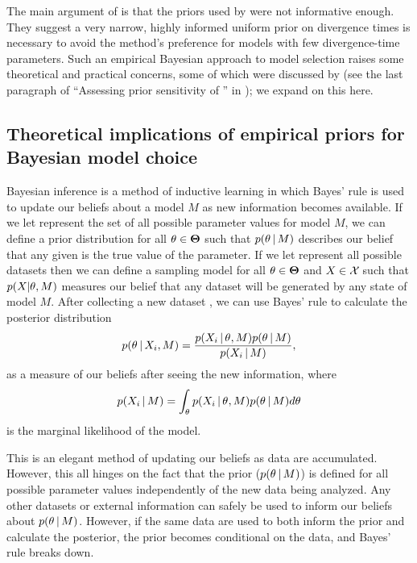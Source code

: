 \documentclass[letterpaper,12pt]{article}
\begin{document}
\begin{linenumbers}
The main argument of \citet{Hickerson2013} is that the priors used by
\citet{Oaks2012} were not informative enough.
They suggest a very narrow, highly informed uniform prior on divergence times
is necessary to avoid the method's preference for models with few
divergence-time parameters.
Such an empirical Bayesian approach to model selection raises some theoretical
and practical concerns, some of which were discussed by \citet{Oaks2012} (see
the last paragraph of ``Assessing prior sensitivity of \msb'' in
\citet{Oaks2012}); we expand on this here.

\subsection*{Theoretical implications of empirical priors for Bayesian model
choice}
\begin{linenomath}
Bayesian inference is a method of inductive learning in which Bayes' rule is
used to update our beliefs about a model $M$ as new information becomes
available.
If we let \allParameterValues represent the set of all possible parameter
values for model $M$, we can define a prior distribution for all $\theta \in
\boldsymbol{\Theta}$ such that $p(\theta \,|\, M)$ describes our belief that
any given \myTheta{} is the true value of the parameter.
If we let \allDatasets represent all possible datasets then we can 
define a sampling model for all $\theta \in
\boldsymbol{\Theta}$ and $\alignment{}{} \in \allDatasets$ such that
$p(\alignment{}{} | \theta, M)$ measures our belief that any dataset \alignment{}{}
will be generated by any state \myTheta{} of model $M$.
After collecting a new dataset , we can use Bayes' rule to
calculate the posterior distribution
\begin{equation}
    p(\myTheta{} \given \alignment{i}{}, M) = \frac{p(\alignment{i}{} \given
    \myTheta{}, M)p(\myTheta{} \given M)}{p(\alignment{i}{} \given M)},
    \label{eq:bayesrule}
\end{equation}
as a measure of our beliefs after seeing the new information, where
\begin{equation}
    p(\alignment{i}{} \given M) = \int_{\myTheta{}} p(\alignment{i}{} \given
    \myTheta{}, M)p(\myTheta{} \given M) d\myTheta{}
    \label{eq:marginallikelhiood}
\end{equation}
is the marginal likelihood of the model.
\end{linenomath}

This is an elegant method of updating our beliefs as data are accumulated.
However, this all hinges on the fact that the prior ($p(\theta_{} \,|\, M)$)
is defined for all possible parameter values independently of the new data
being analyzed.
Any other datasets or external information can safely be used to inform our
beliefs about $p(\theta_{} \,|\, M)$.
However, if the same data are used to both inform the prior and calculate the
posterior, the prior becomes conditional on the data, and Bayes' rule breaks
down.


\end{linenumbers}
\end{document}
